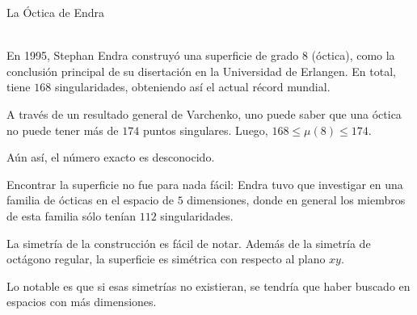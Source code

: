 \documentclass[es]{SurferDesc}%
\begin{document}
\footnotesize




\begin{surferPage}
  \begin{surferTitle}La Óctica de Endra\end{surferTitle} \\
    En 1995, Stephan Endra construyó una superficie de grado $8$ (óctica),
    como la conclusión principal de su disertación en la Universidad de Erlangen.
    En total, tiene $168$ singularidades, obteniendo así el actual récord mundial.
    
    A través de un resultado general de Varchenko, uno puede saber que una óctica
    no puede tener más de $174$ puntos singulares. Luego, $168 \le \mu(8) \le 174$. 
    
    Aún así, el número exacto es desconocido.

    Encontrar la superficie no fue para nada fácil: Endra tuvo que investigar en una
    familia de ócticas en el espacio de $5$ dimensiones, donde en general los
    miembros de esta familia sólo tenían $112$ singularidades.

    La simetría de la construcción es fácil de notar. Además de la simetría de
    octágono regular, la superficie es simétrica con respecto al plano $xy$.

    Lo notable es que si esas simetrías no existieran, se tendría que haber buscado en
    espacios con más dimensiones.
  \begin{surferText}
     \end{surferText}
\end{surferPage}
\end{document}
